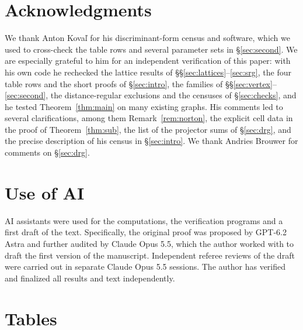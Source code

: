 \documentclass[11pt]{article}
\theoremstyle{definition}
\theoremstyle{remark}
\begin{document}
\section*{Acknowledgments}
We thank Anton Kova\v l for his discriminant-form census and software, which we
used to cross-check the table rows and several parameter sets in
\S\ref{sec:second}. We are especially grateful to him for an independent
verification of this paper: with his own code he rechecked the lattice
results of \S\S\ref{sec:lattices}--\ref{sec:srg}, the four table rows and the
short proofs of \S\ref{sec:intro}, the families of
\S\S\ref{sec:vertex}--\ref{sec:second}, the distance-regular exclusions and the
censuses of \S\ref{sec:checks}, and he tested Theorem~\ref{thm:main} on many
existing graphs. His comments led to several clarifications, among them
Remark~\ref{rem:norton}, the explicit cell data in the proof of
Theorem~\ref{thm:sub}, the list of the projector sums of \S\ref{sec:drg}, and
the precise description of his census in \S\ref{sec:intro}. We thank
Andries Brouwer for comments on \S\ref{sec:drg}.

\section*{Use of AI}
AI assistants were used for the computations, the verification programs and a
first draft of the text. Specifically, the original proof was proposed by
GPT-6.2 Astra and further audited by Claude Opus 5.5, which the author worked
with to draft the first version of the manuscript. Independent referee reviews
of the draft were carried out in separate Claude Opus 5.5 sessions. The author
has verified and finalized all results and text independently.

\clearpage
\appendix
\section{Tables}\label{app:tables}
\end{document}
